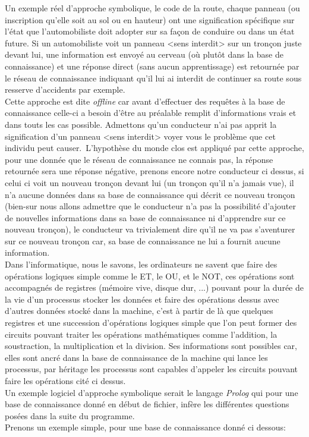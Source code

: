 Un exemple réel d'approche symbolique, le code de la route, chaque panneau (ou inscription qu'elle soit au sol ou en hauteur) ont une signification spécifique sur l'état que l'automobiliste doit adopter sur sa façon de conduire ou dans un état future. Si un automobiliste voit un panneau <sens interdit> sur un tronçon juste devant lui, une information est envoyé au cerveau (où plutôt dans la base de connaissance) et une réponse direct (sans aucun apprentissage) est retournée par le réseau de connaissance indiquant qu'il lui ai interdit de continuer sa route sous resserve d'accidents par exemple.\\
Cette approche est dite \textit{offline}  car avant d'effectuer des requêtes à la base de connaissance celle-ci a besoin d'être au préalable remplit d'informations vrais et dans touts les cas possible. Admettons qu'un conducteur n'ai pas apprit la signification d'un panneau <sens interdit> voyer vous le problème que cet individu peut causer.\ L'hypothèse du monde clos est appliqué par cette approche, pour une donnée que le réseau de connaissance ne connais pas, la réponse retournée sera une réponse négative, prenons encore notre conducteur ci dessus, si celui ci voit un nouveau tronçon devant lui (un tronçon qu'il n'a jamais vue), il n'a aucune données dans sa base de connaissance qui décrit ce nouveau tronçon (bien-sur nous allons admettre que le conducteur n'a pas la possibilité d'ajouter de nouvelles informations dans sa base de connaissance ni d'apprendre sur ce nouveau tronçon), le conducteur va trivialement dire qu'il ne va pas s'aventurer sur ce nouveau tronçon car, sa base de connaissance ne lui a fournit aucune information. \\
\linebreak
Dans l'informatique, nous le savons, les ordinateurs ne savent que faire des opérations logiques simple comme le ET, le OU, et le NOT, ces opérations sont accompagnés de registres (mémoire vive, disque dur, ...) pouvant pour la durée de la vie d'un processus stocker les données et faire des opérations dessus avec d'autres données stocké dans la machine, c'est à partir de là que quelques registres et une succession d'opérations logiques simple que l'on peut former des circuits pouvant traiter les opérations mathématiques comme l'addition, la soustraction, la multiplication et la division. Ses informations sont possibles car, elles sont ancré dans la base de connaissance de la machine qui lance les processus, par héritage les processus sont capables d'appeler les circuits pouvant faire les opérations cité ci dessus. \\ Un exemple logiciel d'approche symbolique serait le langage \textit{Prolog} qui pour une base de connaissance donné en début de fichier, infère les différentes questions posées dans la suite du programme.\\ Prenons un exemple simple, pour une base de connaissance donné ci dessous:
